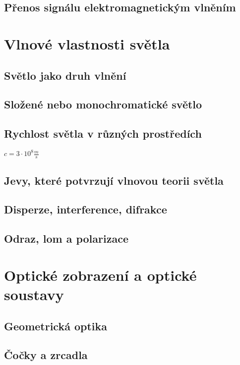 \documentclass[titlepage]{book}
\begin{document}
\section{Přenos signálu elektromagnetickým vlněním}

\chapter{Vlnové vlastnosti světla}

\section{Světlo jako druh vlnění}

\section{Složené nebo monochromatické světlo}

\section{Rychlost světla v různých prostředích}
$c = 3 \cdot 10^8 \frac{m}{s}$\\

\section{Jevy, které potvrzují vlnovou teorii světla}

\section{Disperze, interference, difrakce}

\section{Odraz, lom a polarizace}

\chapter{Optické zobrazení a optické soustavy}

\section{Geometrická optika}

\section{Čočky a zrcadla}
\end{document}
